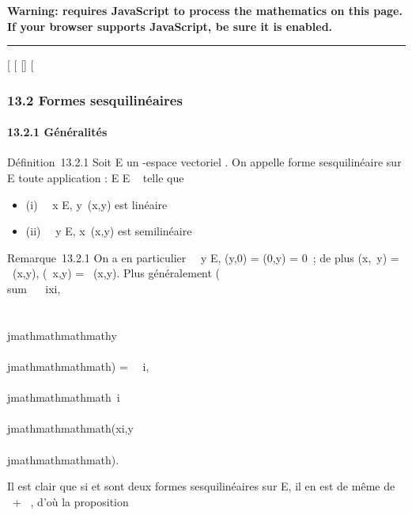 \textbf{Warning: 
requires JavaScript to process the mathematics on this page.\\ If your
browser supports JavaScript, be sure it is enabled.}

\begin{center}\rule{3in}{0.4pt}\end{center}

{[}
{[}
{[}{]}
{[}

\subsubsection{13.2 Formes sesquilinéaires}

\paragraph{13.2.1 Généralités}

Définition~13.2.1 Soit E un -espace vectoriel . On appelle forme
sesquilinéaire sur E toute application \phi : E \times E \rightarrow~  telle que

\begin{itemize}
\itemsep1pt\parskip0pt
\item
  (i) \forall~~x \in E,
  y\mapsto~\phi(x,y) est linéaire
\item
  (ii) \forall~~y \in E,
  x\mapsto~\phi(x,y) est semilinéaire
\end{itemize}

Remarque~13.2.1 On a en particulier \forall~~y \in E,
\phi(y,0) = \phi(0,y) = 0~; de plus \phi(x,\lambda~y) = \lambda~\phi(x,y), \phi(\lambda~x,y) =
\overline\lambda~\phi(x,y). Plus généralement
\phi(\\sum ~
\lambda~ixi,\\\sum
 \mu\\\\jmathmathmathmathy\\\\jmathmathmathmath) =\
\sum ~
i,\\\\jmathmathmathmath\overline\lambda~i\mu\\\\jmathmathmathmath\phi(xi,y\\\\jmathmathmathmath).

Il est clair que si \phi et \psi sont deux formes sesquilinéaires sur E, il en
est de même de \alpha~\phi + \beta~\psi, d'où la proposition


